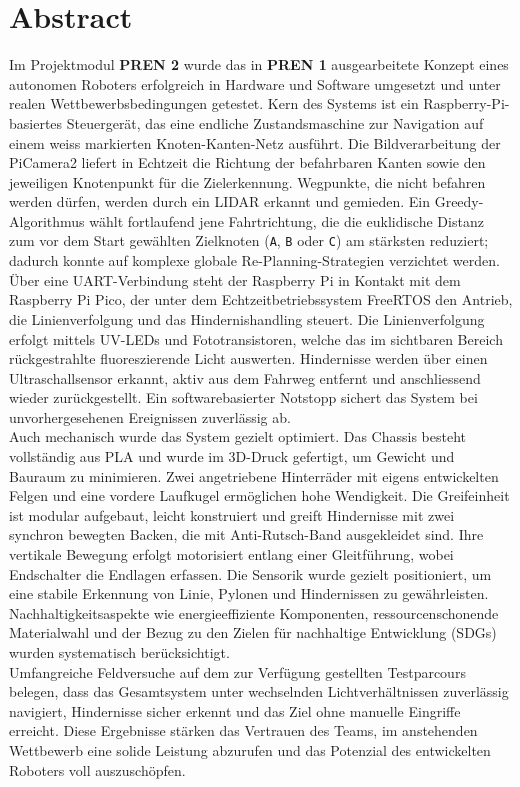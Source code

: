 \documentclass[main.tex]{subfiles} %
\begin{document}
\section*{Abstract}

Im Projektmodul \textbf{PREN 2} wurde das in \textbf{PREN 1} ausgearbeitete
Konzept eines autonomen Roboters erfolgreich in Hardware und Software
umgesetzt und unter realen Wettbewerbsbedingungen getestet.
Kern des Systems ist ein Raspberry-Pi-basiertes Steuergerät, das eine
endliche Zustandsmaschine zur Navigation auf einem weiss markierten
Knoten-Kanten-Netz ausführt. Die Bildverarbeitung der PiCamera2
liefert in Echtzeit die Richtung der befahrbaren Kanten sowie den
jeweiligen Knotenpunkt für die Zielerkennung. Wegpunkte, die nicht befahren
werden dürfen, werden durch ein LIDAR erkannt und gemieden. Ein Greedy-Algorithmus wählt fortlaufend jene Fahrtrichtung,
die die euklidische Distanz zum vor dem Start gewählten Zielknoten
(\texttt{A}, \texttt{B} oder \texttt{C}) am stärksten reduziert; dadurch
konnte auf komplexe globale Re-Planning-Strategien verzichtet werden.\\

Über eine UART-Verbindung steht der Raspberry Pi in Kontakt mit dem Raspberry
Pi Pico, der unter dem Echtzeitbetriebssystem FreeRTOS den Antrieb, die
Linienverfolgung und das Hindernishandling steuert. Die Linienverfolgung erfolgt
mittels UV-LEDs und Fototransistoren, welche das im sichtbaren Bereich rückgestrahlte
fluoreszierende Licht auswerten. Hindernisse werden über einen Ultraschallsensor
erkannt, aktiv aus dem Fahrweg entfernt und anschliessend wieder zurückgestellt.
Ein softwarebasierter Notstopp sichert das System bei unvorhergesehenen
Ereignissen zuverlässig ab.\\

Auch mechanisch wurde das System gezielt optimiert. Das Chassis besteht 
vollständig aus PLA und wurde im 3D-Druck gefertigt, um Gewicht und Bauraum 
zu minimieren. Zwei angetriebene Hinterräder mit eigens entwickelten Felgen 
und eine vordere Laufkugel ermöglichen hohe Wendigkeit. Die Greifeinheit 
ist modular aufgebaut, leicht konstruiert und greift Hindernisse mit zwei 
synchron bewegten Backen, die mit Anti-Rutsch-Band ausgekleidet sind. Ihre 
vertikale Bewegung erfolgt motorisiert entlang einer Gleitführung, wobei 
Endschalter die Endlagen erfassen. Die Sensorik wurde gezielt positioniert, 
um eine stabile Erkennung von Linie, Pylonen und Hindernissen zu 
gewährleisten.\\

Nachhaltigkeitsaspekte wie energieeffiziente Komponenten, ressourcenschonende
Materialwahl und der Bezug zu den Zielen für nachhaltige Entwicklung (SDGs) wurden
systematisch berücksichtigt.\\

Umfangreiche Feldversuche auf dem zur Verfügung gestellten Testparcours belegen,
dass das Gesamtsystem unter wechselnden Lichtverhältnissen zuverlässig
navigiert, Hindernisse sicher erkennt und das Ziel ohne manuelle Eingriffe
erreicht. Diese Ergebnisse stärken das Vertrauen des Teams, im anstehenden
Wettbewerb eine solide Leistung abzurufen und das Potenzial des entwickelten
Roboters voll auszuschöpfen.
\end{document}
